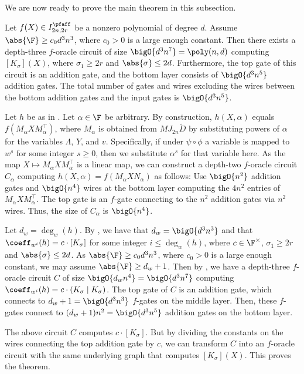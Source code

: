 \documentclass[letterpaper, 11pt]{amsart}
\begin{document}
We are now ready to prove the main theorem in this subsection.

\begin{thrm}\label{thrm:bipfaffian_canonical_extraction}
    Let $f(X) \in I^{\pfaff}_{2n, 2r}$ be a nonzero polynomial of degree $d$.
    Assume $\abs{\F} \geq c_0 d^3 n^3$, where $c_0>0$ is a large enough constant.
    Then there exists a depth-three $f$-oracle circuit of size $\bigO{d^3 n^7} = \poly(n, d)$ computing $[K_\sigma](X)$, where $\sigma_1\geq 2r$ and $\abs{\sigma} \leq 2d$.
    Furthermore, the top gate of this circuit is an addition gate, and the bottom layer consists of $\bigO{d^3 n^5}$ addition gates.
    The total number of gates and wires excluding the wires between the bottom addition gates and the input gates is $\bigO{d^3 n^5}$.
\end{thrm}
\begin{pf}
Let $h$ be as in .
Let $\alpha \in \F$ be arbitrary.
By construction, $h(X,\alpha)$ equals $f(M_\alpha X M_\alpha^{\top})$, where $M_\alpha$ is obtained from $M J_{2n} \widetilde{D}$ by substituting powers of $\alpha$ for the variables $\Lambda$, $Y$, and $v$.
Specifically, if under $\psi \circ \phi$ a variable is mapped to $w^s$ for some integer $s \geq 0$, then we substitute $\alpha^s$ for that variable here.
As the map $X\mapsto M_\alpha X M_\alpha^{\top}$ is a linear map, we can construct a depth-two $f$-oracle circuit $C_\alpha$ computing $h(X,\alpha) = f(M_\alpha X N_\alpha)$ as follows:
Use $\bigO{n^2}$ addition gates and $\bigO{n^4}$ wires at the bottom layer computing the $4n^2$ entries of $M_\alpha X M_\alpha^{\top}$.
The top gate is an $f$-gate connecting to the $n^2$ addition gates via $n^2$ wires.
Thus, the size of $C_\alpha$ is $\bigO{n^4}$.

Let $d_w=\deg_w(h)$.
By , we have that $d_w = \bigO{d^3 n^3}$ and that $\coeff_{w^i}(h) = c\cdot [K_\sigma]$ for some integer $i \leq \deg_w(h)$, where $c\in\F^\times$, $\sigma_1\geq 2r$ and $\abs{\sigma}\leq 2d$.
As $\abs{\F} \geq c_0 d^3n^3$, where $c_0>0$ is a large enough constant, we may assume $\abs{\F} \geq d_w+1$.
Then by , we have a depth-three $f$-oracle circuit $C$ of size $\bigO{d_w n^4} = \bigO{d^3 n^7}$ computing $\coeff_{w^i}(h)=c\cdot (K_\sigma\mid K_\sigma)$.
The top gate of $C$ is an addition gate, which connects to $d_w+1 = \bigO{d^3 n^3}$ $f$-gates on the middle layer.
Then, these $f$-gates connect to $(d_w+1)n^2 = \bigO{d^3 n^5}$ addition gates on the bottom layer.

The above circuit $C$ computes $c\cdot [K_\sigma]$.
But by dividing the constants on the wires connecting the top addition gate by $c$, we can transform $C$ into an $f$-oracle circuit with the same underlying graph that computes $[K_\sigma](X)$.
This proves the theorem.
\end{pf}
\end{document}
